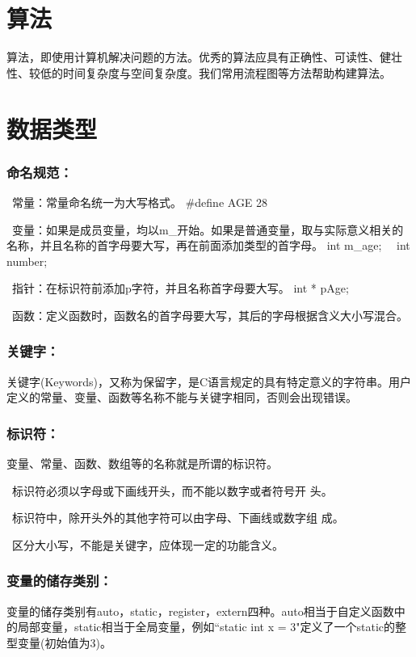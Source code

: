 \documentclass[zihao=-4,UTF8]{report}
\begin{document}
\section{算法}
算法，即使用计算机解决问题的方法。优秀的算法应具有正确性、可读性、健壮性、较低的时间复杂度与空间复杂度。我们常用流程图等方法帮助构建算法。

\section{数据类型}
\subsubsection{命名规范：}
\ 常量：常量命名统一为大写格式。{\color{gray} \#define AGE 28 }\par
{}\ 变量：如果是成员变量，均以m\_开始。如果是普通变量，取与实际意义相关的名称，并且名称的首字母要大写，再在前面添加类型的首字母。{\color{gray} int m\_age; \ \  int number; }\par\par
{}\ 指针：在标识符前添加p字符，并且名称首字母要大写。{\color{gray} int * pAge;}\par
{}\ 函数：定义函数时，函数名的首字母要大写，其后的字母根据含义大小写混合。

\subsubsection{关键字：}
关键字(Keywords)，又称为保留字，是C语言规定的具有特定意义的字符串。用户定义的常量、变量、函数等名称不能与关键字相同，否则会出现错误。

\subsubsection{标识符：}
变量、常量、函数、数组等的名称就是所谓的标识符。\par
{}\ 标识符必须以字母或下画线开头，而不能以数字或者符号开
头。\par
{}\ 标识符中，除开头外的其他字符可以由字母、下画线或数字组
成。\par
{}\ 区分大小写，不能是关键字，应体现一定的功能含义。\par

\subsubsection{变量的储存类别：}
变量的储存类别有auto，static，register，extern四种。auto相当于自定义函数中的局部变量，static相当于全局变量，例如``static int x = 3"定义了一个static的整型变量(初始值为3)。
\end{document}

